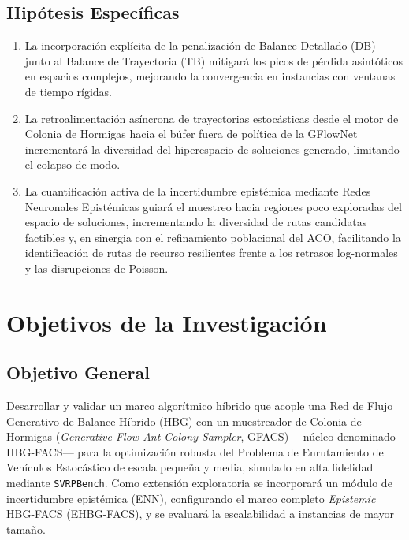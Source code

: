 \documentclass[12pt]{report}
\begin{document}
\section*{Hip\'otesis Espec\'ificas}
\begin{enumerate}[label=\textbf{H\arabic*.},leftmargin=1.5cm,itemsep=0.5em]
  \item La incorporaci\'on expl\'icita de la penalizaci\'on de Balance Detallado (DB) junto al Balance de Trayectoria (TB) mitigar\'a los picos de p\'erdida asint\'oticos en espacios complejos, mejorando la convergencia en instancias con ventanas de tiempo r\'igidas.
  \item La retroalimentaci\'on as\'incrona de trayectorias estoc\'asticas desde el motor de Colonia de Hormigas hacia el b\'ufer fuera de pol\'itica de la GFlowNet incrementar\'a la diversidad del hiperespacio de soluciones generado, limitando el colapso de modo.
  \item La cuantificaci\'on activa de la incertidumbre epist\'emica mediante Redes Neuronales Epist\'emicas guiar\'a el muestreo hacia regiones poco exploradas del espacio de soluciones, incrementando la diversidad de rutas candidatas factibles y, en sinergia con el refinamiento poblacional del ACO, facilitando la identificaci\'on de rutas de recurso resilientes frente a los retrasos log-normales y las disrupciones de Poisson.
\end{enumerate}

\chapter*{Objetivos de la Investigaci\'on}

\section*{Objetivo General}
Desarrollar y validar un marco algor\'itmico h\'ibrido que acople una Red de Flujo Generativo de Balance H\'ibrido (HBG) con un muestreador de Colonia de Hormigas (\textit{Generative Flow Ant Colony Sampler}, GFACS) ---n\'ucleo denominado HBG-FACS--- para la optimizaci\'on robusta del Problema de Enrutamiento de Veh\'iculos Estoc\'astico de escala peque\~na y media, simulado en alta fidelidad mediante \texttt{SVRPBench}. Como extensi\'on exploratoria se incorporar\'a un m\'odulo de incertidumbre epist\'emica (ENN), configurando el marco completo \textit{Epistemic} HBG-FACS (EHBG-FACS), y se evaluar\'a la escalabilidad a instancias de mayor tama\~no.
\end{document}
